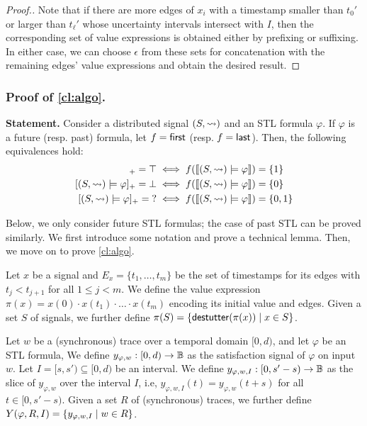 \begin{proof}[\normalsize Proof.]
	Note that if there are more edges of $x_i$ with a timestamp smaller than $t_0'$ or larger than $t_\ell'$ whose uncertainty intervals intersect with $I$, then the corresponding set of value expressions is obtained either by prefixing or suffixing.
	In either case, we can choose $\epsilon$ from these sets for concatenation with the remaining edges' value expressions and obtain the desired result.
\end{proof}

\subsubsection*{Proof of \cref{cl:algo}.}
\textbf{Statement.} 
Consider a distributed signal $(S,{\rightsquigarrow})$ and an STL formula $\varphi$.
If $\varphi$ is a future (resp. past) formula, let $f = \textsf{first}$ (resp. $f = \textsf{last}$).
Then, the following equivalences hold:
\begin{align*}
	[(S,{\hb}) \models \varphi]_+ = \top &\iff f(\llbracket (S, {\hb}) \models \varphi \rrbracket) = \{1\}\\
	[(S,{\hb}) \models \varphi]_+ = \bot &\iff f(\llbracket (S, {\hb}) \models \varphi \rrbracket) = \{0\}\\
	[(S,{\hb}) \models \varphi]_+ = {?} &\iff f(\llbracket (S, {\hb}) \models \varphi \rrbracket) = \{0,1\}
\end{align*}

Below, we only consider future STL formulas; the case of past STL can be proved similarly.
We first introduce some notation and prove a technical lemma.
Then, we move on to prove \cref{cl:algo}. 

Let $x$ be a signal and $E_x = \{t_1, \ldots, t_m\}$ be the set of timestamps for its edges with $t_j < t_{j+1}$ for all $1 \leq j < m$.
We define the value expression $\pi(x) = x(0) \cdot x(t_1) \cdot \ldots \cdot x(t_m)$ encoding its initial value and edges.
Given a set $S$ of signals, we further define $\pi(S) = \{ \destutter(\pi(x)) \st x \in S \}$.

Let $w$ be a (synchronous) trace over a temporal domain $[0,d)$, and let $\varphi$ be an STL formula,
We define $y_{\varphi,w} : [0,d) \to \mathbb{B}$ as the satisfaction signal of $\varphi$ on input $w$.
Let $I = [s, s') \subseteq [0,d)$ be an interval.
We define $y_{\varphi,w,I} : [0, s' - s) \to \mathbb{B}$ as the slice of $y_{\varphi,w}$ over the interval $I$, i.e, $y_{\varphi,w,I}(t) = y_{\varphi,w}(t + s)$ for all $t \in [0, s' - s)$.
Given a set  $R$ of (synchronous) traces, we further define $Y(\varphi, R, I) = \{ y_{\varphi,w,I} \st w \in R \}$.

